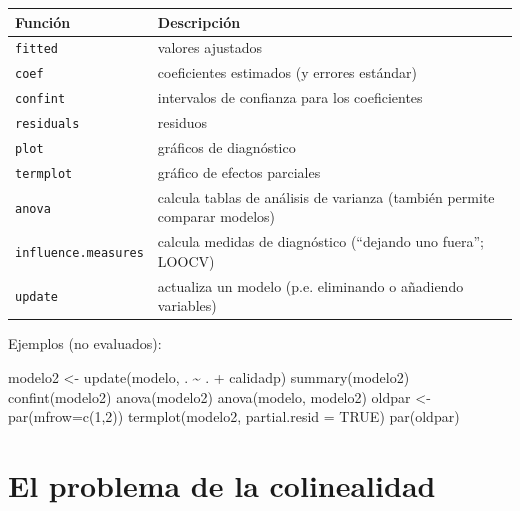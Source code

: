 \documentclass[
]{book}
\newenvironment{Shaded}{\begin{snugshade}}{\end{snugshade}}
\newcommand{\AttributeTok}[1]{\textcolor[rgb]{0.77,0.63,0.00}{#1}}
\newcommand{\ConstantTok}[1]{\textcolor[rgb]{0.00,0.00,0.00}{#1}}
\newcommand{\DecValTok}[1]{\textcolor[rgb]{0.00,0.00,0.81}{#1}}
\newcommand{\FunctionTok}[1]{\textcolor[rgb]{0.00,0.00,0.00}{#1}}
\newcommand{\NormalTok}[1]{#1}
\newcommand{\OtherTok}[1]{\textcolor[rgb]{0.56,0.35,0.01}{#1}}
\newcommand{\SpecialCharTok}[1]{\textcolor[rgb]{0.00,0.00,0.00}{#1}}
\theoremstyle{break}
\theoremstyle{definition}
\theoremstyle{definition}
\theoremstyle{definition}
\theoremstyle{definition}
\theoremstyle{remark}
\begin{document}
\begin{longtable}[]{@{}
  >{\raggedright\arraybackslash}p{}
  >{\raggedright\arraybackslash}p{}@{}}
\toprule
Función & Descripción \\
\midrule
\endhead
\texttt{fitted} & valores ajustados \\
\texttt{coef} & coeficientes estimados (y errores estándar) \\
\texttt{confint} & intervalos de confianza para los coeficientes \\
\texttt{residuals} & residuos \\
\texttt{plot} & gráficos de diagnóstico \\
\texttt{termplot} & gráfico de efectos parciales \\
\texttt{anova} & calcula tablas de análisis de varianza (también permite comparar modelos) \\
\texttt{influence.measures} & calcula medidas de diagnóstico (``dejando uno fuera''; LOOCV) \\
\texttt{update} & actualiza un modelo (p.e. eliminando o añadiendo variables) \\
\bottomrule
\end{longtable}

Ejemplos (no evaluados):

\begin{Shaded}
\begin{Highlighting}[]
\NormalTok{modelo2 }\OtherTok{\textless{}{-}} \FunctionTok{update}\NormalTok{(modelo, . }\SpecialCharTok{\textasciitilde{}}\NormalTok{ . }\SpecialCharTok{+}\NormalTok{ calidadp)}
\FunctionTok{summary}\NormalTok{(modelo2)}
\FunctionTok{confint}\NormalTok{(modelo2)}
\FunctionTok{anova}\NormalTok{(modelo2)}
\FunctionTok{anova}\NormalTok{(modelo, modelo2)}
\NormalTok{oldpar }\OtherTok{\textless{}{-}} \FunctionTok{par}\NormalTok{(}\AttributeTok{mfrow=}\FunctionTok{c}\NormalTok{(}\DecValTok{1}\NormalTok{,}\DecValTok{2}\NormalTok{))}
\FunctionTok{termplot}\NormalTok{(modelo2, }\AttributeTok{partial.resid =} \ConstantTok{TRUE}\NormalTok{)}
\FunctionTok{par}\NormalTok{(oldpar)}
\end{Highlighting}
\end{Shaded}

\hypertarget{colinealidad}{%
\section{El problema de la colinealidad}\label{colinealidad}}
\end{document}
